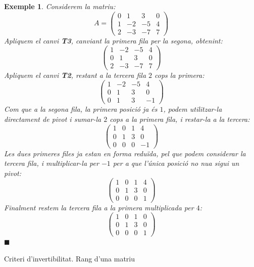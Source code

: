 \documentclass[
  11pt,
]{book}
\makeatletter
\numberwithin{dummy}{section}
\theoremstyle{maincolornumbox}
\theoremstyle{blacknumex}
\newtheorem{exampleT}{Exemple}[chapter]
\theoremstyle{blacknumbox}
\theoremstyle{maincolornum}
\newenvironment{example}{\begin{exampleT}}{\hfill{\tiny\ensuremath{\blacksquare}}\end{exampleT}}
\renewcommand{\section}{\@startsection{section}{1}{\z@}
{-4ex \@plus -1ex \@minus -.4ex}
{1ex \@plus.2ex }
{\normalfont\large\sffamily\bfseries}}
\makeatother
\begin{document}
\begin{example}
Considerem la matriu: \[A=\begin{pmatrix}
    0 & 1 & 3 & 0 \\  1 & -2 & -5 & 4\\ 2 & -3 & -7 & 7
    \end{pmatrix}\] Apliquem el canvi \textbf{T3}, canviant la primera fila per
la segona, obtenint: \[\begin{pmatrix}
    1 & -2 & -5 & 4\\0 & 1 & 3 & 0 \\   2 & -3 & -7 & 7
    \end{pmatrix}\] Apliquem el canvi \textbf{T2}, restant a la tercera fila \(2\)
cops la primera: \[\begin{pmatrix}
    1 & -2 & -5 & 4\\0 & 1 & 3 & 0 \\   0 & 1 & 3 & -1
    \end{pmatrix}\] Com que a la segona fila, la primera posició ja és \(1\),
podem utilitzar-la directament de pivot i sumar-la \(2\) cops a la primera
fila, i restar-la a la tercera: \[\begin{pmatrix}
    1 & 0 & 1 & 4\\0 & 1 & 3 & 0 \\   0 & 0 & 0 & -1
    \end{pmatrix}\] Les dues primeres files ja estan en forma reduïda, pel
que podem considerar la tercera fila, i multiplicar-la per \(-1\) per a
que l'única posició no nua sigui un pivot: \[\begin{pmatrix}
    1 & 0 & 1 & 4\\0 & 1 & 3 & 0 \\   0 & 0 & 0 & 1
    \end{pmatrix}\] Finalment restem la tercera fila a la primera
multiplicada per \(4\): \[\begin{pmatrix}
    1 & 0 & 1 & 0\\0 & 1 & 3 & 0 \\   0 & 0 & 0 & 1
    \end{pmatrix}\]
\end{example}

\hypertarget{criteri-dinvertibilitat.-rang-duna-matriu}{%
\section{Criteri d'invertibilitat. Rang d'una matriu}\label{criteri-dinvertibilitat.-rang-duna-matriu}}
\end{document}
